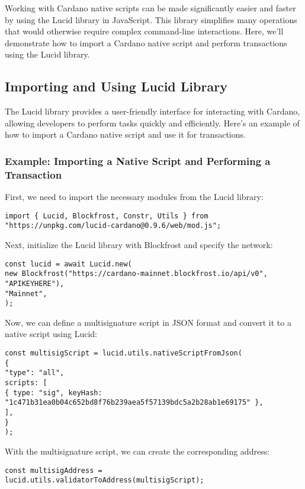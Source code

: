 Working with Cardano native scripts can be made significantly easier and faster by using the Lucid library in JavaScript. This library simplifies many operations that would otherwise require complex command-line interactions. Here, we'll demonstrate how to import a Cardano native script and perform transactions using the Lucid library.

\subsection{Importing and Using Lucid Library}

The Lucid library provides a user-friendly interface for interacting with Cardano, allowing developers to perform tasks quickly and efficiently. Here’s an example of how to import a Cardano native script and use it for transactions.

\subsubsection{Example: Importing a Native Script and Performing a Transaction}

First, we need to import the necessary modules from the Lucid library:

\begin{lstlisting}
import { Lucid, Blockfrost, Constr, Utils } from "https://unpkg.com/lucid-cardano@0.9.6/web/mod.js";
\end{lstlisting}

Next, initialize the Lucid library with Blockfrost and specify the network:

\begin{lstlisting}
const lucid = await Lucid.new(
new Blockfrost("https://cardano-mainnet.blockfrost.io/api/v0", "APIKEYHERE"),
"Mainnet",
);
\end{lstlisting}

Now, we can define a multisignature script in JSON format and convert it to a native script using Lucid:

\begin{lstlisting}
const multisigScript = lucid.utils.nativeScriptFromJson(
{
"type": "all",
scripts: [
{ type: "sig", keyHash: "1c471b31ea0b04c652bd8f76b239aea5f57139bdc5a2b28ab1e69175" },
],
}
);
\end{lstlisting}

With the multisignature script, we can create the corresponding address:

\begin{lstlisting}
const multisigAddress = lucid.utils.validatorToAddress(multisigScript);
\end{lstlisting}

